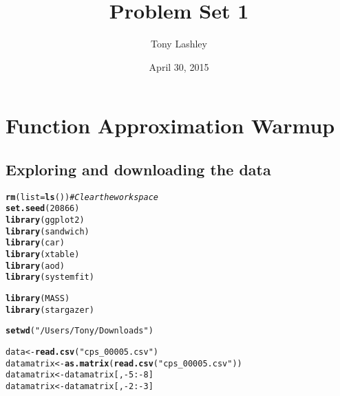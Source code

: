 \documentclass{article}\usepackage[]{graphicx}\usepackage[]{color}
\title{Problem Set 1}
\author{Tony Lashley}
\date{April 30, 2015}
\makeatletter
\newcommand{\hlnum}[1]{\textcolor[rgb]{0.686,0.059,0.569}{#1}}%
\newcommand{\hlstr}[1]{\textcolor[rgb]{0.192,0.494,0.8}{#1}}%
\newcommand{\hlcom}[1]{\textcolor[rgb]{0.678,0.584,0.686}{\textit{#1}}}%
\newcommand{\hlopt}[1]{\textcolor[rgb]{0,0,0}{#1}}%
\newcommand{\hlstd}[1]{\textcolor[rgb]{0.345,0.345,0.345}{#1}}%
\newcommand{\hlkwb}[1]{\textcolor[rgb]{0.69,0.353,0.396}{#1}}%
\newcommand{\hlkwc}[1]{\textcolor[rgb]{0.333,0.667,0.333}{#1}}%
\newcommand{\hlkwd}[1]{\textcolor[rgb]{0.737,0.353,0.396}{\textbf{#1}}}%
\newenvironment{kframe}{%
 \def\at@end@of@kframe{}%
 \ifinner\ifhmode%
  \def\at@end@of@kframe{\end{minipage}}%
  \begin{minipage}{\columnwidth}%
 \fi\fi%
 \def\FrameCommand##1{\hskip\@totalleftmargin \hskip-\fboxsep
 \colorbox{shadecolor}{##1}\hskip-\fboxsep
     \hskip-\linewidth \hskip-\@totalleftmargin \hskip\columnwidth}%
 \MakeFramed {\advance\hsize-\width
   \@totalleftmargin\z@ \linewidth\hsize
   \@setminipage}}%
 {\par\unskip\endMakeFramed%
 \at@end@of@kframe}
\newenvironment{knitrout}{}{} %
\makeatother
\begin{document}
\section{Function Approximation Warmup}
\subsection{Exploring and downloading the data}

\begin{knitrout}
\color{fgcolor}\begin{kframe}
\begin{alltt}
\hlkwd{rm}\hlstd{(}\hlkwc{list}\hlstd{=}\hlkwd{ls}\hlstd{())}           \hlcom{# Clear the workspace}
\hlkwd{set.seed}\hlstd{(}\hlnum{20866}\hlstd{)}
\hlkwd{library}\hlstd{(ggplot2)}
\hlkwd{library}\hlstd{(sandwich)}
\hlkwd{library}\hlstd{(car)}
\hlkwd{library}\hlstd{(xtable)}
\hlkwd{library}\hlstd{(aod)}
\hlkwd{library}\hlstd{(systemfit)}
\end{alltt}


{\ttfamily\noindent\itshape\color{messagecolor}{\#\# Loading required package: Matrix\\\#\# Loading required package: lmtest\\\#\# Loading required package: zoo\\\#\# \\\#\# Attaching package: 'zoo'\\\#\# \\\#\# The following objects are masked from 'package:base':\\\#\# \\\#\#\ \ \ \  as.Date, as.Date.numeric}}\begin{alltt}
\hlkwd{library}\hlstd{(MASS)}
\hlkwd{library}\hlstd{(stargazer)}
\end{alltt}


{\ttfamily\noindent\itshape\color{messagecolor}{\#\# \\\#\# Please cite as: \\\#\# \\\#\#\ \ Hlavac, Marek (2014). stargazer: LaTeX code and ASCII text for well-formatted regression and summary statistics tables.\\\#\#\ \ R package version 5.1. http://CRAN.R-project.org/package=stargazer}}\begin{alltt}
\hlkwd{setwd}\hlstd{(}\hlstr{"/Users/Tony/Downloads"}\hlstd{)}

\hlstd{data} \hlkwb{<-} \hlkwd{read.csv}\hlstd{(}\hlstr{"cps_00005.csv"}\hlstd{)}
\hlstd{datamatrix} \hlkwb{<-} \hlkwd{as.matrix}\hlstd{(}\hlkwd{read.csv}\hlstd{(}\hlstr{"cps_00005.csv"}\hlstd{))}
\hlstd{datamatrix} \hlkwb{<-} \hlstd{datamatrix[,}\hlopt{-}\hlnum{5}\hlopt{:-}\hlnum{8}\hlstd{]}
\hlstd{datamatrix} \hlkwb{<-} \hlstd{datamatrix[,}\hlopt{-}\hlnum{2}\hlopt{:-}\hlnum{3}\hlstd{]}



\end{alltt}
\end{kframe}
\end{knitrout}
\end{document}
